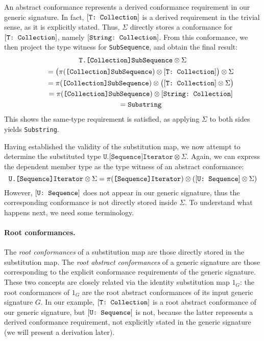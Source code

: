 \documentclass[../generics]{subfiles}
\begin{document}
An abstract conformance represents a derived conformance requirement in our generic signature. In fact, $[\texttt{T:~Collection}]$ is a derived requirement in the trivial sense, as it is explicitly stated. Thus, $\Sigma$ directly stores a conformance for $[\texttt{T:~Collection}]$, namely $[\texttt{String:~Collection}]$. From this conformance, we then project the type witness for \texttt{SubSequence}, and obtain the final result:
\begin{gather*}
\texttt{T.[Collection]SubSequence} \otimes \Sigma\\
\qquad {} = \bigl(\pi(\texttt{[Collection]SubSequence}) \otimes [\texttt{T:~Collection}]\bigr) \otimes \Sigma\\
\qquad {} = \pi(\texttt{[Collection]SubSequence}) \otimes \bigl([\texttt{T:~Collection}] \otimes \Sigma\bigr)\\
\qquad {} = \pi(\texttt{[Collection]SubSequence}) \otimes [\texttt{String:~Collection}]\\
\qquad {} = \texttt{Substring}
\end{gather*}
This shows the same-type requirement is satisfied, as applying $\Sigma$ to both sides yields \texttt{Substring}.

Having established the validity of the substitution map, we now attempt to determine the substituted type $\texttt{U.[Sequence]Iterator} \otimes \Sigma$. Again, we can express the dependent member type as the type witness of an abstract conformance:
\[\texttt{U.[Sequence]Iterator} \otimes \Sigma = \pi(\texttt{[Sequence]Iterator}) \otimes ([\texttt{U:~Sequence}] \otimes \Sigma)\]
However, $[\texttt{U:~Sequence}]$ does not appear in our generic signature, thus the corresponding conformance is not directly stored inside $\Sigma$. To understand what happens next, we need some terminology. 

\paragraph{Root conformances.} The \emph{root conformances} of a substitution map are those directly stored in the substitution map. The \emph{root abstract conformances} of a generic signature are those corresponding to the explicit conformance requirements of the generic signature. These two concepts are closely related via the identity substitution map $1_G$: the root conformances of $1_G$ are the root abstract conformances of its input generic signature $G$. In our example, $[\texttt{T:~Collection}]$ is a root abstract conformance of our generic signature, but $[\texttt{U:~Sequence}]$ is not, because the latter represents a derived conformance requirement, not explicitly stated in the generic signature (we will present a derivation later).
\end{document}
